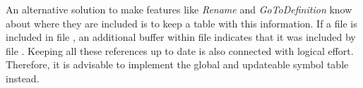 An alternative solution to make features like \textit{Rename} and \textit{GoToDefinition} know about where they are included is to keep a table with this information.
If a file  is included in file , an additional buffer within file  indicates that it was included by file .
Keeping all these references up to date is also connected with logical effort.
Therefore, it is advisable to implement the global and updateable symbol table instead.
